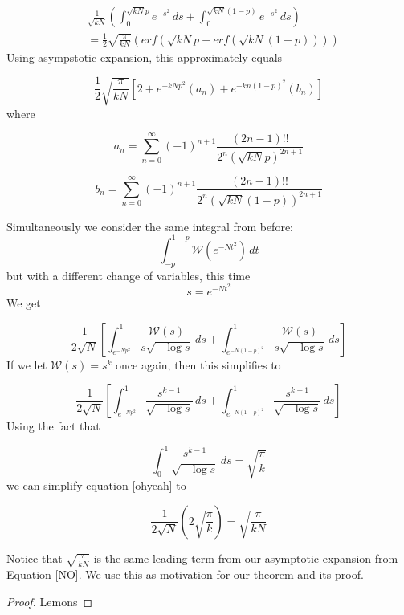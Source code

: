 \documentclass{article}
\begin{document}
\begin{equation} 
\begin{split} 
& \frac{1}{\sqrt{kN}}\left(\int_0^{\sqrt{kN}p}e^{-s^2}\,ds + \int_0^{\sqrt{kN}(1-p)}e^{-s^2}\,ds\right) \\ &= \frac{1}{2}\sqrt{\frac{\pi}{kN}}\left(erf\left(\sqrt{kN}p + erf\left(\sqrt{kN}(1-p)\right)\right)\right)
 \end{split}
 \end{equation}  Using asympstotic expansion, this approximately equals 

\begin{equation} 
\label{NO}
\frac{1}{2}\sqrt{\frac{\pi}{kN}}\left[ 2 + e^{-kNp^2}(a_n) + e^{-kn(1-p)^2}(b_n) \right] 
\end{equation} where

\begin{equation}
a_n = \displaystyle\sum\limits_{n=0}^{\infty} (-1)^{n+1}\frac{(2n-1)!!}{2^n (\sqrt{kN}p)^{2n+1}}
\end{equation}

\begin{equation}
b_n = \displaystyle\sum\limits_{n=0}^{\infty} (-1)^{n+1} \frac{(2n-1)!!}{2^n(\sqrt{kN}(1-p))^{2n+1}}
\end{equation}


Simultaneously we consider the same integral from before: $$\int_{-p}^{1-p}\mathcal{W}(e^{-Nt^2})\,dt$$ but with a different change of variables, this time $$s = e^{-Nt^2}$$  We get 

\begin{equation}
\label{ohyeah}
\frac{1}{2\sqrt{N}}\left[\int_{e^{-Np^2}}^{1} \frac{\mathcal{W}(s)}{s\sqrt{-\log s}}\,ds + \int_{e^{-N(1-p)^2}}^{1} \frac{\mathcal{W}(s)}{s\sqrt{-\log s}}\,ds\right]
\end{equation}  If we let $\mathcal{W}(s) = s^k$ once again, then this simplifies to 

\begin{equation}
\frac{1}{2\sqrt{N}}\left[\int_{e^{-Np^2}}^{1} \frac{s^{k-1}}{\sqrt{-\log s}}\,ds + \int_{e^{-N(1-p)^2}}^{1} \frac{s^{k-1}}{\sqrt{-\log s}}\,ds\right]
\end{equation}  Using the fact that

\begin{equation}
\int_{0}^{1} \frac{s^{k-1}}{\sqrt{-\log s}}\,ds = \sqrt{\frac{\pi}{k}}
\end{equation} we can simplify equation \ref{ohyeah} to

\begin{equation}
\frac{1}{2\sqrt{N}}\left(2\sqrt{\frac{\pi}{k}}\right) = \sqrt{\frac{\pi}{kN}}
\end{equation}

Notice that $\sqrt{\frac{\pi}{kN}}$ is the same leading term from our asymptotic expansion from Equation \ref{NO}.  We use this as motivation for our theorem and its proof.

\begin{proof}
Lemons
\end{proof}
\end{document}
